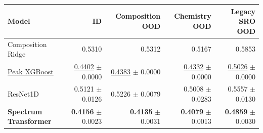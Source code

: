 \small\setlength{\tabcolsep}{5pt}
\begin{tabular}{@{}lrrrr@{}}
\toprule
Model & ID & Composition OOD & Chemistry OOD & Legacy SRO OOD \\
\midrule
Composition Ridge & 0.5310 & 0.5312 & 0.5167 & 0.5853 \\
\underline{Peak XGBoost} & \underline{0.4402} $\pm$ 0.0000 & \underline{0.4383} $\pm$ 0.0000 & \underline{0.4332} $\pm$ 0.0000 & \underline{0.5026} $\pm$ 0.0000 \\
ResNet1D & 0.5121 $\pm$ 0.0126 & 0.5226 $\pm$ 0.0079 & 0.5008 $\pm$ 0.0283 & 0.5557 $\pm$ 0.0130 \\
\textbf{Spectrum Transformer} & \textbf{0.4156} $\pm$ 0.0023 & \textbf{0.4135} $\pm$ 0.0031 & \textbf{0.4079} $\pm$ 0.0013 & \textbf{0.4859} $\pm$ 0.0030 \\
\bottomrule
\end{tabular}
